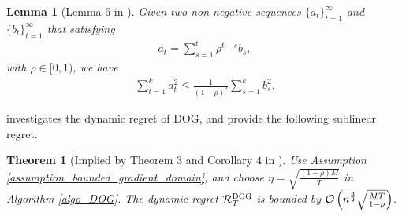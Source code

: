 \documentclass{article}
\newtheorem{Theorem}{\bf{Theorem}}
\newtheorem{Lemma}{\bf{Lemma}}
\begin{document}
\begin{Lemma}[Lemma $6$ in \citep{Tang:2018un}]
\label{Lemma_hanlin_2}
Given two non-negative sequences $\{a_t\}_{t=1}^{\infty}$ and $\{b_t\}_{t=1}^{\infty}$ that satisfying
\begin{align}
\nonumber
a_t = \sum_{s=1}^t \rho^{t-s} b_s,
\end{align} with $\rho \in [0,1)$, we have
\begin{align}
\nonumber
\sum_{t=1}^k a_t^2 \le \frac{1}{(1-\rho)^2}\sum_{s=1}^k b_s^2.
\end{align}
\end{Lemma}


\citet{8015179Shahram} investigates the dynamic regret of DOG, and provide the following sublinear regret.
\begin{Theorem}[Implied by Theorem $3$ and Corollary $4$ in \citet{8015179Shahram}]
\label{theorem_privious_dog_regret}
Use Assumption \ref{assumption_bounded_gradient_domain}, and choose $\eta = \sqrt{\frac{(1-\rho) M}{T}}$ in Algorithm \ref{algo_DOG}. The dynamic regret ${\mathcal{R}}_T^{\textsc{DOG}}$ is bounded by ${\mathcal{O}\left( n^{\frac{3}{2}}\sqrt{\frac{MT}{1-\rho}}  \right)}$.
\end{Theorem}
\end{document}
